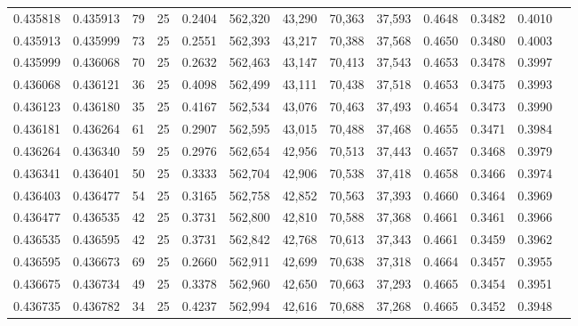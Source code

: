 \begin{tabular}{rrrrrrrrrrrrr}
0.435818 & 0.435913 &    79 &  25 &                                     0.2404 & 562,320 &  43,290 &  70,363 &  37,593 & 0.4648 & 0.3482 & 0.4010 \\
0.435913 & 0.435999 &    73 &  25 &                                     0.2551 & 562,393 &  43,217 &  70,388 &  37,568 & 0.4650 & 0.3480 & 0.4003 \\
0.435999 & 0.436068 &    70 &  25 &                                     0.2632 & 562,463 &  43,147 &  70,413 &  37,543 & 0.4653 & 0.3478 & 0.3997 \\
0.436068 & 0.436121 &    36 &  25 &                                     0.4098 & 562,499 &  43,111 &  70,438 &  37,518 & 0.4653 & 0.3475 & 0.3993 \\
0.436123 & 0.436180 &    35 &  25 &                                     0.4167 & 562,534 &  43,076 &  70,463 &  37,493 & 0.4654 & 0.3473 & 0.3990 \\
0.436181 & 0.436264 &    61 &  25 &                                     0.2907 & 562,595 &  43,015 &  70,488 &  37,468 & 0.4655 & 0.3471 & 0.3984 \\
0.436264 & 0.436340 &    59 &  25 &                                     0.2976 & 562,654 &  42,956 &  70,513 &  37,443 & 0.4657 & 0.3468 & 0.3979 \\
0.436341 & 0.436401 &    50 &  25 &                                     0.3333 & 562,704 &  42,906 &  70,538 &  37,418 & 0.4658 & 0.3466 & 0.3974 \\
0.436403 & 0.436477 &    54 &  25 &                                     0.3165 & 562,758 &  42,852 &  70,563 &  37,393 & 0.4660 & 0.3464 & 0.3969 \\
0.436477 & 0.436535 &    42 &  25 &                                     0.3731 & 562,800 &  42,810 &  70,588 &  37,368 & 0.4661 & 0.3461 & 0.3966 \\
0.436535 & 0.436595 &    42 &  25 &                                     0.3731 & 562,842 &  42,768 &  70,613 &  37,343 & 0.4661 & 0.3459 & 0.3962 \\
0.436595 & 0.436673 &    69 &  25 &                                     0.2660 & 562,911 &  42,699 &  70,638 &  37,318 & 0.4664 & 0.3457 & 0.3955 \\
0.436675 & 0.436734 &    49 &  25 &                                     0.3378 & 562,960 &  42,650 &  70,663 &  37,293 & 0.4665 & 0.3454 & 0.3951 \\
0.436735 & 0.436782 &    34 &  25 &                                     0.4237 & 562,994 &  42,616 &  70,688 &  37,268 & 0.4665 & 0.3452 & 0.3948 \\

\end{tabular}
